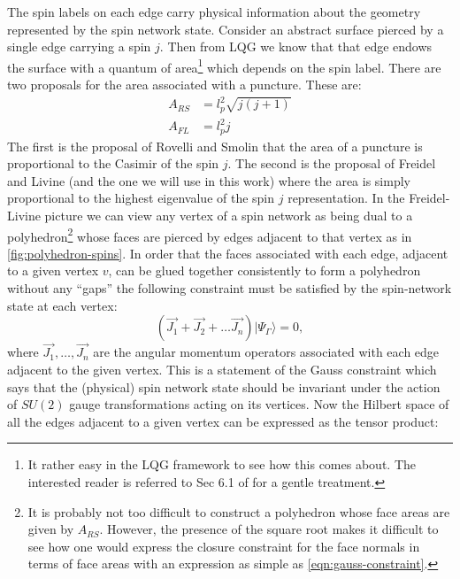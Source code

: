 \documentclass[twocolumn,draft,aps,nofootinbib,nobibnotes,final]{revtex4-2}
\newcommand{\ket}[1]{\vert #1 \rangle}
\begin{document}
The spin labels on each edge carry physical information about the geometry represented by the spin network state. Consider an abstract surface pierced by a single edge carrying a spin $ j $. Then from LQG we know that that edge endows the surface with a quantum of area\footnote{It rather easy in the LQG framework to see how this comes about. The interested reader is referred to Sec 6.1 of \cite{Vaid2014LQG-for-the-Bewildered} for a gentle treatment.} which depends on the spin label. There are two proposals for the area associated with a puncture. These are:
\begin{subequations}\label{eqn:area-operators}
	\begin{align}
		A_{RS} & = l_p^2 \sqrt{j(j+1)} \label{eqn:rovelli-smolin} \\
		A_{FL} & = l_p^2 j \label{eqn:freidel-livine}
	\end{align}
\end{subequations}
The first is the proposal of Rovelli and Smolin that the area of a puncture is proportional to the Casimir of the spin $ j $. The second is the proposal of Freidel and Livine (and the one we will use in this work) where the area is simply proportional to the highest eigenvalue of the spin $ j $ representation. In the Freidel-Livine picture we can view any vertex of a spin network as being dual to a polyhedron\footnote{It is probably not too difficult to construct a polyhedron whose face areas are given by $ A_{RS} $. However, the presence of the square root makes it difficult to see how one would express the closure constraint for the face normals in terms of face areas with an expression as simple as \autoref{eqn:gauss-constraint}.} whose faces are pierced by edges adjacent to that vertex as in \autoref{fig:polyhedron-spins}. In order that the faces associated with each edge, adjacent to a given vertex $ v $, can be glued together consistently to form a polyhedron without any ``gaps'' the following constraint must be satisfied by the spin-network state at each vertex:
\begin{equation}\label{eqn:gauss-constraint}
	(\vec{J_1} + \vec{J_2} + \ldots \vec{J_n})\ket{\Psi_\Gamma} = 0,
\end{equation}
where $ \vec{J_1}, \ldots , \vec{J_n} $ are the angular momentum operators associated with each edge adjacent to the given vertex. This is a statement of the Gauss constraint which says that the (physical) spin network state should be invariant under the action of $ SU(2) $ gauge transformations acting on its vertices. Now the Hilbert space of all the edges adjacent to a given vertex can be expressed as the tensor product:
\end{document}
